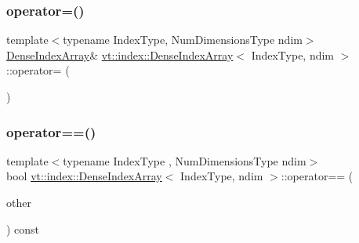 \mbox{\label{structvt_1_1index_1_1_dense_index_array_a5f8e772873b44f670de731fe087e3a5a}} 
\subsubsection{\texorpdfstring{operator=()}{operator=()}}
{\footnotesize\ttfamily template$<$typename Index\+Type, Num\+Dimensions\+Type ndim$>$ \\
\hyperlink{structvt_1_1index_1_1_dense_index_array}{Dense\+Index\+Array}\& \hyperlink{structvt_1_1index_1_1_dense_index_array}{vt\+::index\+::\+Dense\+Index\+Array}$<$ Index\+Type, ndim $>$\+::operator= (\begin{DoxyParamCaption}\item[{\hyperlink{structvt_1_1index_1_1_dense_index_array}{Dense\+Index\+Array}$<$ Index\+Type, ndim $>$ const \&}]{ }\end{DoxyParamCaption})\hspace{0.3cm}{\ttfamily [default]}}

\mbox{\label{structvt_1_1index_1_1_dense_index_array_aa407d7e96709099c4a7ee179c65c627f}} 
\subsubsection{\texorpdfstring{operator==()}{operator==()}}
{\footnotesize\ttfamily template$<$typename Index\+Type , Num\+Dimensions\+Type ndim$>$ \\
bool \hyperlink{structvt_1_1index_1_1_dense_index_array}{vt\+::index\+::\+Dense\+Index\+Array}$<$ Index\+Type, ndim $>$\+::operator== (\begin{DoxyParamCaption}\item[{\hyperlink{structvt_1_1index_1_1_dense_index_array_aec95c4ed1b4071d31d24142f02429dbd}{Dense\+Index\+Array\+Type} const \&}]{other }\end{DoxyParamCaption}) const}

\mbox{\label{structvt_1_1index_1_1_dense_index_array_ab157c3c1d228b385f2c7be5f78634d93}} 
